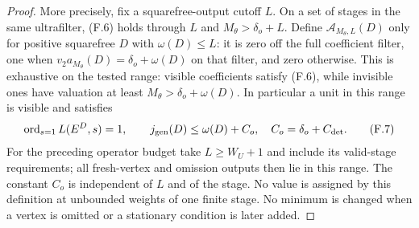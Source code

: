 \documentclass[11pt]{article}
\theoremstyle{definition}
\theoremstyle{remark}
\newcommand{\ord}{\operatorname{ord}}
\begin{document}
\begin{proof}
More precisely, fix a squarefree-output cutoff $L$. On a set of
stages in the same ultrafilter, (F.6) holds through $L$ and
$M_\theta>\delta_o+L$. Define $\mathcal A_{M_\theta,L}(D)$ only
for positive squarefree $D$ with $\omega(D)\le L$: it is zero off the full coefficient filter,
one when $v_2a_{M_\theta}(D)=\delta_o+\omega(D)$ on that filter,
and zero otherwise. This is exhaustive on the tested range:
visible coefficients satisfy (F.6), while invisible ones have
valuation at least $M_\theta>\delta_o+\omega(D)$.
In particular a unit in this range is visible and satisfies
\[
 \ord_{s=1}L(E^D,s)=1,\qquad
        j_{\rm gen}(D)\le\omega(D)+C_o,\quad C_o=\delta_o+C_{\rm det}.
 \tag{F.7}
\]
For the preceding operator budget take $L\ge W_U+1$ and include
its valid-stage requirements; all fresh-vertex and omission outputs
then lie in this range. The constant $C_o$ is independent of $L$
and of the stage. No value is assigned by this definition at
unbounded weights of one finite stage. No minimum is changed when
a vertex is omitted or a stationary condition is later added.
\end{proof}
\end{document}
